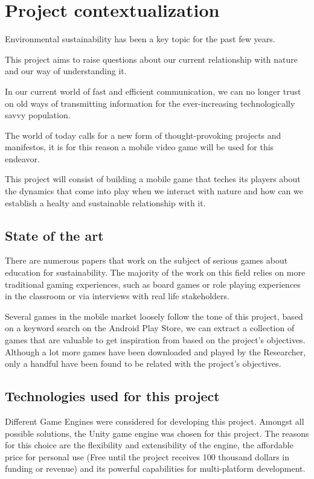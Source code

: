 \chapter{Project contextualization}

Environmental sustainability has been a key topic for the past few years.

This project aims to raise questions about our current relationship with
nature and our way of understanding it.

In our current world of fast and efficient communication, we can no longer
trust on old ways of transmitting
information for the ever-increasing technologically savvy population.

The world of today calls for a new form of thought-provoking projects and
manifestos, it is for this reason a mobile video game will be used for this
endeavor.

This project will consist of building a mobile game that teches its players 
about the dynamics that come into play when we interact with nature
and how can we establish a healty and sustainable relationship with it.

\section{State of the art}

There are numerous papers that work on the subject of serious
games about education for sustainability. The majority of the work on this
field relies on more traditional gaming experiences, such as board games
or role playing experiences in the classroom or via interviews with real life
stakeholders.

Several games in the mobile market loosely follow the tone of this project,
based on a keyword search on the Android Play Store, we can extract a
collection of games that are valuable to get inspiration from based on the
project's objectives.
Although a lot more games have been downloaded and played by the
Researcher, only a handful have been found to be related with the project's
objectives.

\section{Technologies used for this project}

Different Game Engines were considered for developing this project. Amongst
all possible solutions, the Unity game engine was chosen for this project.
The reasons for this choice are the flexibility and extensibility of the
engine, the affordable price for personal use (Free until the project receives
100 thousand dollars in funding or revenue) and its powerful capabilities for
multi-platform development.
